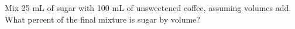 Mix 25 mL of sugar with 100 mL of unsweetened coffee, assuming volumes add. What percent of the final mixture is sugar by volume?
